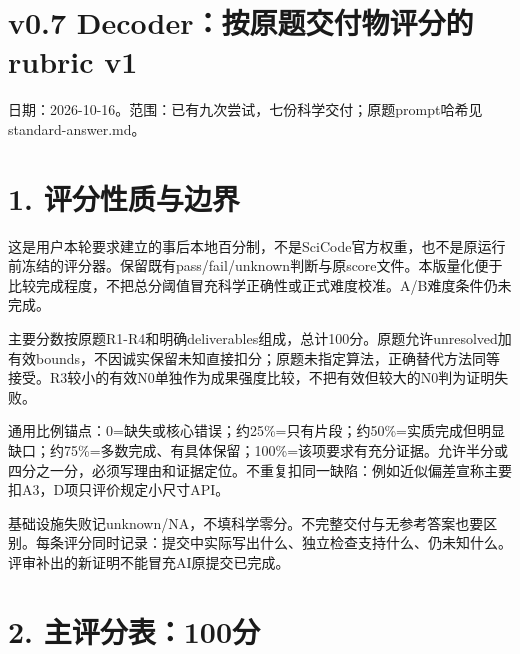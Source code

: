 \documentclass[11pt,a4paper]{article}
\begin{document}
\section*{v0.7 Decoder：按原题交付物评分的 rubric v1}

日期：2026-10-16。范围：已有九次尝试，七份科学交付；原题prompt哈希见standard-answer.md。

\section*{1. 评分性质与边界}

这是用户本轮要求建立的事后本地百分制，不是SciCode官方权重，也不是原运行前冻结的评分器。保留既有pass/fail/unknown判断与原score文件。本版量化便于比较完成程度，不把总分阈值冒充科学正确性或正式难度校准。A/B难度条件仍未完成。

主要分数按原题R1-R4和明确deliverables组成，总计100分。原题允许unresolved加有效bounds，不因诚实保留未知直接扣分；原题未指定算法，正确替代方法同等接受。R3较小的有效N0单独作为成果强度比较，不把有效但较大的N0判为证明失败。

通用比例锚点：0=缺失或核心错误；约25\%=只有片段；约50\%=实质完成但明显缺口；约75\%=多数完成、有具体保留；100\%=该项要求有充分证据。允许半分或四分之一分，必须写理由和证据定位。不重复扣同一缺陷：例如近似偏差宣称主要扣A3，D项只评价规定小尺寸API。

基础设施失败记unknown/NA，不填科学零分。不完整交付与无参考答案也要区别。每条评分同时记录：提交中实际写出什么、独立检查支持什么、仍未知什么。评审补出的新证明不能冒充AI原提交已完成。

\section*{2. 主评分表：100分}
\end{document}
